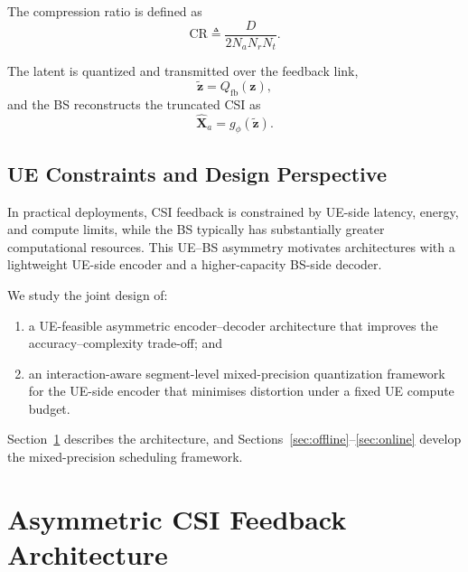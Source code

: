 \documentclass[conference]{IEEEtran}
\begin{document}
The compression ratio is defined as
\begin{equation}
\mathrm{CR} \triangleq \frac{D}{2 N_a N_r N_t}.
\label{eq:cr}
\end{equation}

The latent is quantized and transmitted over the feedback link,
\begin{equation}
\tilde{\mathbf{z}} = Q_{\mathrm{fb}}(\mathbf{z}),
\label{eq:latent_quant}
\end{equation}
and the BS reconstructs the truncated CSI as
\begin{equation}
\hat{\mathbf{X}}_a = g_\phi(\tilde{\mathbf{z}}).
\label{eq:decoder}
\end{equation}

\subsection{UE Constraints and Design Perspective}
\label{subsec:constraints}
In practical deployments, CSI feedback is constrained by UE-side latency, energy, and compute limits, while the BS typically has substantially greater computational resources. This UE--BS asymmetry motivates architectures with a lightweight UE-side encoder and a higher-capacity BS-side decoder.

We study the joint design of:
\begin{enumerate}
\item a UE-feasible asymmetric encoder--decoder architecture that improves the accuracy--complexity trade-off; and
\item an interaction-aware segment-level mixed-precision quantization framework for the UE-side encoder that minimises distortion under a fixed UE compute budget.
\end{enumerate}
Section~\ref{sec:asym_arch} describes the architecture, and Sections~\ref{sec:offline}--\ref{sec:online} develop the mixed-precision scheduling framework.

\section{Asymmetric CSI Feedback Architecture}
\label{sec:asym_arch}
\end{document}
